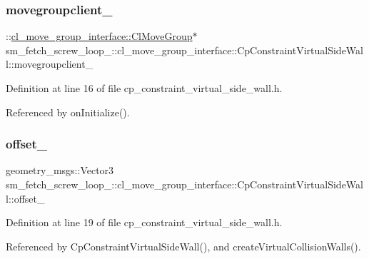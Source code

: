 \subsubsection{\texorpdfstring{movegroupclient\+\_\+}{movegroupclient\_}}
{\footnotesize\ttfamily \+::\hyperlink{classcl__move__group__interface_1_1ClMoveGroup}{cl\+\_\+move\+\_\+group\+\_\+interface\+::\+Cl\+Move\+Group}$\ast$ sm\+\_\+fetch\+\_\+screw\+\_\+loop\+\_\+::cl\+\_\+move\+\_\+group\+\_\+interface\+::\+Cp\+Constraint\+Virtual\+Side\+Wall\+::movegroupclient\+\_\+\hspace{0.3cm}{\ttfamily [private]}}



Definition at line 16 of file cp\+\_\+constraint\+\_\+virtual\+\_\+side\+\_\+wall.\+h.



Referenced by on\+Initialize().

\mbox{\label{classsm__fetch__screw__loop__1_1_1cl__move__group__interface_1_1CpConstraintVirtualSideWall_a2bb600f30ac245821b733051f67ff1f5}} 
\subsubsection{\texorpdfstring{offset\+\_\+}{offset\_}}
{\footnotesize\ttfamily geometry\+\_\+msgs\+::\+Vector3 sm\+\_\+fetch\+\_\+screw\+\_\+loop\+\_\+::cl\+\_\+move\+\_\+group\+\_\+interface\+::\+Cp\+Constraint\+Virtual\+Side\+Wall\+::offset\+\_\+\hspace{0.3cm}{\ttfamily [private]}}



Definition at line 19 of file cp\+\_\+constraint\+\_\+virtual\+\_\+side\+\_\+wall.\+h.



Referenced by Cp\+Constraint\+Virtual\+Side\+Wall(), and create\+Virtual\+Collision\+Walls().

